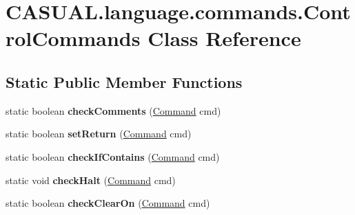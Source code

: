 \hypertarget{class_c_a_s_u_a_l_1_1language_1_1commands_1_1_control_commands}{\section{C\-A\-S\-U\-A\-L.\-language.\-commands.\-Control\-Commands Class Reference}
\label{class_c_a_s_u_a_l_1_1language_1_1commands_1_1_control_commands}
}
\subsection*{Static Public Member Functions}
\begin{DoxyCompactItemize}
\item 
\hypertarget{class_c_a_s_u_a_l_1_1language_1_1commands_1_1_control_commands_a7622d3b9433a931d742c4b458cad4857}{static boolean {\bfseries check\-Comments} (\hyperlink{class_c_a_s_u_a_l_1_1language_1_1_command}{Command} cmd)}\label{class_c_a_s_u_a_l_1_1language_1_1commands_1_1_control_commands_a7622d3b9433a931d742c4b458cad4857}

\item 
\hypertarget{class_c_a_s_u_a_l_1_1language_1_1commands_1_1_control_commands_a17eab272841b35a0007411a01e0962c7}{static boolean {\bfseries set\-Return} (\hyperlink{class_c_a_s_u_a_l_1_1language_1_1_command}{Command} cmd)}\label{class_c_a_s_u_a_l_1_1language_1_1commands_1_1_control_commands_a17eab272841b35a0007411a01e0962c7}

\item 
\hypertarget{class_c_a_s_u_a_l_1_1language_1_1commands_1_1_control_commands_a59ac3813bcd0033810dc76ee33a49944}{static boolean {\bfseries check\-If\-Contains} (\hyperlink{class_c_a_s_u_a_l_1_1language_1_1_command}{Command} cmd)}\label{class_c_a_s_u_a_l_1_1language_1_1commands_1_1_control_commands_a59ac3813bcd0033810dc76ee33a49944}

\item 
\hypertarget{class_c_a_s_u_a_l_1_1language_1_1commands_1_1_control_commands_ac1b3aaaf78871754db6fa806abf764b2}{static void {\bfseries check\-Halt} (\hyperlink{class_c_a_s_u_a_l_1_1language_1_1_command}{Command} cmd)}\label{class_c_a_s_u_a_l_1_1language_1_1commands_1_1_control_commands_ac1b3aaaf78871754db6fa806abf764b2}

\item 
\hypertarget{class_c_a_s_u_a_l_1_1language_1_1commands_1_1_control_commands_a352f61dca1b27bc2ae76e78a925a6f6f}{static boolean {\bfseries check\-Clear\-On} (\hyperlink{class_c_a_s_u_a_l_1_1language_1_1_command}{Command} cmd)}\label{class_c_a_s_u_a_l_1_1language_1_1commands_1_1_control_commands_a352f61dca1b27bc2ae76e78a925a6f6f}


\end{DoxyCompactItemize}
